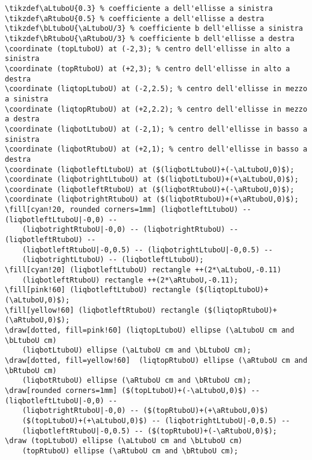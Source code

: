 \documentclass[italian, a4paper]{article}
\begin{document}
\begin{Verbatim}
\tikzdef\aLtuboU{0.3} % coefficiente a dell'ellisse a sinistra
\tikzdef\aRtuboU{0.5} % coefficiente a dell'ellisse a destra
\tikzdef\bLtuboU{\aLtuboU/3} % coefficiente b dell'ellisse a sinistra
\tikzdef\bRtuboU{\aRtuboU/3} % coefficiente b dell'ellisse a destra
\coordinate (topLtuboU) at (-2,3); % centro dell'ellisse in alto a sinistra
\coordinate (topRtuboU) at (+2,3); % centro dell'ellisse in alto a destra
\coordinate (liqtopLtuboU) at (-2,2.5); % centro dell'ellisse in mezzo a sinistra
\coordinate (liqtopRtuboU) at (+2,2.2); % centro dell'ellisse in mezzo a destra
\coordinate (liqbotLtuboU) at (-2,1); % centro dell'ellisse in basso a sinistra
\coordinate (liqbotRtuboU) at (+2,1); % centro dell'ellisse in basso a destra
\coordinate (liqbotleftLtuboU) at ($(liqbotLtuboU)+(-\aLtuboU,0)$);
\coordinate (liqbotrightLtuboU) at ($(liqbotLtuboU)+(+\aLtuboU,0)$);
\coordinate (liqbotleftRtuboU) at ($(liqbotRtuboU)+(-\aRtuboU,0)$);
\coordinate (liqbotrightRtuboU) at ($(liqbotRtuboU)+(+\aRtuboU,0)$);
\fill[cyan!20, rounded corners=1mm] (liqbotleftLtuboU) -- (liqbotleftLtuboU|-0,0) --
    (liqbotrightRtuboU|-0,0) -- (liqbotrightRtuboU) -- (liqbotleftRtuboU) --
    (liqbotleftRtuboU|-0,0.5) -- (liqbotrightLtuboU|-0,0.5) --
    (liqbotrightLtuboU) -- (liqbotleftLtuboU);
\fill[cyan!20] (liqbotleftLtuboU) rectangle ++(2*\aLtuboU,-0.11)
    (liqbotleftRtuboU) rectangle ++(2*\aRtuboU,-0.11);
\fill[pink!60] (liqbotleftLtuboU) rectangle ($(liqtopLtuboU)+(\aLtuboU,0)$);
\fill[yellow!60] (liqbotleftRtuboU) rectangle ($(liqtopRtuboU)+(\aRtuboU,0)$);
\draw[dotted, fill=pink!60] (liqtopLtuboU) ellipse (\aLtuboU cm and \bLtuboU cm)
    (liqbotLtuboU) ellipse (\aLtuboU cm and \bLtuboU cm);
\draw[dotted, fill=yellow!60]  (liqtopRtuboU) ellipse (\aRtuboU cm and \bRtuboU cm)
    (liqbotRtuboU) ellipse (\aRtuboU cm and \bRtuboU cm);
\draw[rounded corners=1mm] ($(topLtuboU)+(-\aLtuboU,0)$) -- (liqbotleftLtuboU|-0,0) --
    (liqbotrightRtuboU|-0,0) -- ($(topRtuboU)+(+\aRtuboU,0)$)
    ($(topLtuboU)+(+\aLtuboU,0)$) -- (liqbotrightLtuboU|-0,0.5) --
    (liqbotleftRtuboU|-0,0.5) -- ($(topRtuboU)+(-\aRtuboU,0)$);
\draw (topLtuboU) ellipse (\aLtuboU cm and \bLtuboU cm)
    (topRtuboU) ellipse (\aRtuboU cm and \bRtuboU cm);
\end{Verbatim}
\end{document}
